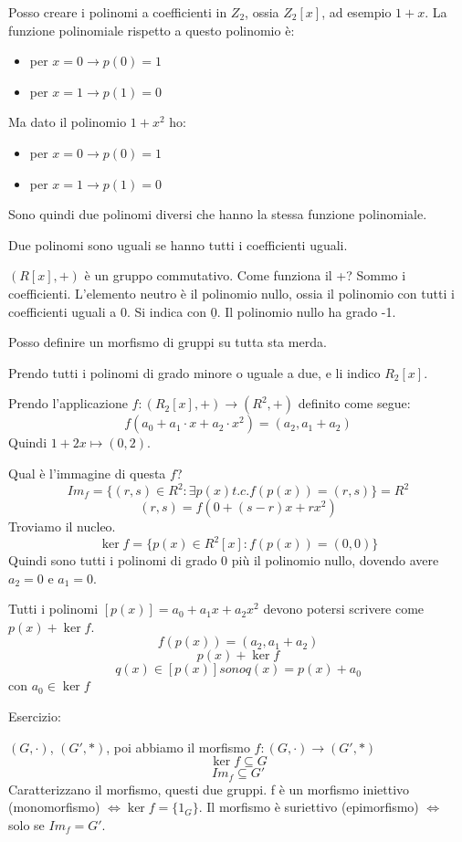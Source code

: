 Posso creare i polinomi a coefficienti in $Z_2$, ossia $Z_2[x]$, ad esempio $1 + x$. La funzione polinomiale rispetto a questo polinomio \`e:
\begin{itemize}
    \item per $x = 0 \to p(0) = 1$
    \item per $x = 1 \to p(1) = 0$
\end{itemize}
Ma dato il polinomio $1 + x^2$ ho:
\begin{itemize}
    \item per $x = 0 \to p(0) = 1$
    \item per $x = 1 \to p(1) = 0$
\end{itemize}
Sono quindi due polinomi diversi che hanno la stessa funzione polinomiale.

Due polinomi sono uguali se hanno tutti i coefficienti uguali.

$(R[x], +)$ \`e un gruppo commutativo. Come funziona il +? Sommo i coefficienti. L'elemento neutro \`e il polinomio nullo, ossia il polinomio con tutti i coefficienti uguali a 0. Si indica con $\underline{0}$. Il polinomio nullo ha grado -1.

Posso definire un morfismo di gruppi su tutta sta merda.

Prendo tutti i polinomi di grado minore o uguale a due, e li indico $R_2[x]$.

Prendo l'applicazione $f : (R_2[x], +) \to (R^2, +)$ definito come segue:
\[
f(a_0 + a_1 \cdot x + a_2 \cdot x^2) = (a_2, a_1 + a_2)
\]
Quindi $1 + 2x \mapsto (0, 2)$.

Qual \`e l'immagine di questa $f$? 
\[
Im_f = \{ (r, s) \in R^2 : \exists p(x) t.c. f(p(x)) = (r,s)\} = R^2
\]
\[
(r, s) = f(0 + (s - r) x + r x^2)
\]
Troviamo il nucleo.
\[
\ker f = \{ p(x) \in R^2[x] : f(p(x)) = (0, 0)\}
\]
Quindi sono tutti i polinomi di grado 0 pi\`u il polinomio nullo, dovendo avere $a_2 = 0$ e $a_1 = 0$.

Tutti i polinomi $[p(x)] = a_0 + a_1 x + a_2 x^2$ devono potersi scrivere come $p(x) + \ker f$.
\[
f(p(x)) = (a_2, a_1 + a_2)
\]
\[
p(x) + \ker f
\]
\[
q(x) \in [p(x)] sono q(x) = p(x) + a_0
\]
con $a_0 \in \ker f$

Esercizio:

$(G, \cdot)$, $(G', \ast)$, poi abbiamo il morfismo $f : (G, \cdot) \to (G', \ast)$
\[
\ker f \subseteq G
\]
\[
Im_f \subseteq G'
\]
Caratterizzano il morfismo, questi due gruppi. f \`e un morfismo iniettivo (monomorfismo) $\Leftrightarrow \ker f = \{ 1_G\}$. Il morfismo \`e suriettivo (epimorfismo) $\Leftrightarrow$ solo se $Im_f = G'$.

